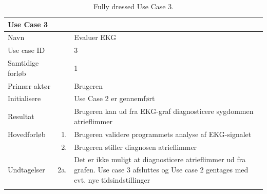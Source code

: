 \begin{longtabu} to  %
    {\large \textbf{Use Case 3}} && \\
    \toprule
    Navn &&    Evaluer EKG\\
    Use case ID &&    3\\
    Samtidige forløb &&    1\\
    Primær aktør &&    Brugeren\\
    Initialisere &&    Use Case 2 er gennemført   \\
    Resultat &&   Brugeren kan ud fra EKG-graf diagnosticere sygdommen atrieflimmer  \\ \midrule
    Hovedforløb &    1. &    Brugeren validere programmets analyse af EKG-signalet \\[-1ex]	
                &    2. &    Brugeren stiller diagnosen atrieflimmer\\ \midrule
                
    Undtagelser &    2a. &    Det er ikke muligt at diagnosticere atrieflimmer ud fra grafen. Use case 3 afsluttes og Use case 2 gentages med evt. nye tidsindstillinger \\ \bottomrule
\caption{Fully dressed Use Case 3.}
\label{UC3}
\end{longtabu}

